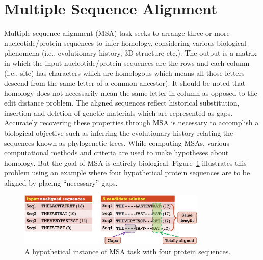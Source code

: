 \section{Multiple Sequence Alignment}
Multiple sequence alignment (MSA) task seeks to arrange three or more nucleotide/protein sequences to infer homology, considering various biological phenomena (i.e., evolutionary history, 3D structure etc.). The output is a matrix in which the input nucleotide/protein sequences are the rows and each column (i.e., site) has characters which are homologous which means all those letters descend from the same letter of a common ancestor). It should be noted that homology does not necessarily mean the same letter in column as opposed to the edit distance problem. The aligned sequences reflect historical substitution, insertion and deletion of genetic materials which are represented as gaps. Accurately recovering these properties through MSA is necessary to accomplish a biological objective such as inferring the evolutionary history relating the sequences known as phylogenetic trees. While computing MSAs, various computational methods and criteria are used to make hypotheses about homology. But the goal of MSA is entirely biological. Figure~\ref{fig:msa_io} illustrates this problem using an example where four hypothetical protein sequences are to be aligned by placing ``necessary'' gaps. %

\begin{figure}[!htbp]
	\centering
	\includegraphics[width=0.8\textwidth]{cybernatics/Figure/msa_io}
	\caption{A hypothetical instance of MSA task with four protein sequences.} 
	\label{fig:msa_io}
\end{figure}

\graphicspath{{cybernatics/supp/}}
 
